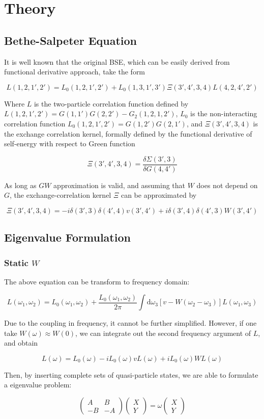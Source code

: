 \documentclass{article}
\begin{document}
\section{Theory}
\subsection{Bethe-Salpeter Equation}
It is well known that the original BSE, which can be easily derived from functional derivative approach, take the form

$$
L(1,2,1',2')=L_0(1,2,1',2')+L_0(1,3,1',3') \Xi(3',4',3,4)L(4,2,4',2')
$$

Where $L$ is the two-particle correlation function defined by $L(1,2,1',2') = G(1,1')G(2,2')-G_2(1,2,1,2')$, $L_0$ is the non-interacting correlation function $L_0(1,2,1',2')=G(1,2')G(2,1')$, and $\Xi(3',4',3,4)$ is the exchange correlation kernel, formally defined by the functional derivative of self-energy with respect to Green function

$$
\Xi(3',4',3,4) = \frac{\delta\Sigma(3',3)}{\delta G(4,4')}
$$

As long as $GW$ approximation is valid, and assuming that $W$ does not depend on $G$, the exchange-correlation kernel $\Xi$ can be approximated by

$$
\Xi(3',4',3,4)=-i\delta(3',3)\delta(4',4)v(3',4')+i\delta(3',4)\delta(4',3)W(3',4')
$$
\subsection{Eigenvalue Formulation}
\subsubsection{Static $W$}
The above equation can be transform to frequency domain:

$$
L(\omega_1,\omega_2)=L_0(\omega_1,\omega_2)+\frac{L_0(\omega_1,\omega_2)}{2\pi}\int\mathrm d\omega_3[v-W(\omega_2-\omega_3)]L(\omega_1,\omega_3)
$$

Due to the coupling in frequency, it cannot be further simplified. However, if one take $W(\omega)\approx W(0)$, we can integrate out the second frequency argument of $L$, and obtain

$$
L(\omega)=L_0(\omega)-iL_0(\omega)vL(\omega)+iL_0(\omega)WL(\omega)
$$

Then, by inserting complete sets of quasi-particle states, we are able to formulate a eigenvalue problem:

$$
\begin{pmatrix}A&B\\-B&-A\end{pmatrix}
\begin{pmatrix}X\\Y\end{pmatrix}=\omega
\begin{pmatrix}X\\Y\end{pmatrix}
$$
\end{document}
